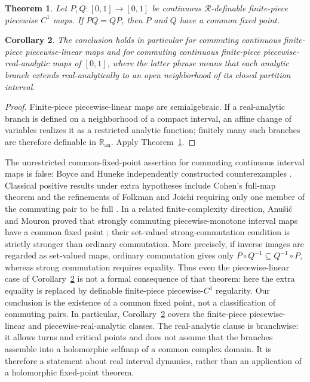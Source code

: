 \documentclass[11pt]{article}
\newtheorem{theorem}{Theorem}
\newtheorem{corollary}[theorem]{Corollary}
\theoremstyle{definition}
\theoremstyle{remark}
\newcommand{\I}{[0,1]}
\begin{document}
\begin{theorem}\label{thm:tame-C1}
Let $P,Q\colon\I\to\I$ be continuous $\mathcal R$-definable finite-piece
piecewise $C^1$ maps.  If $PQ=QP$, then $P$ and $Q$ have a common fixed
point.
\end{theorem}

\begin{corollary}\label{cor:analytic-PL}
The conclusion holds in particular for commuting continuous finite-piece
piecewise-linear maps and for commuting continuous finite-piece
piecewise-real-analytic maps of $[0,1]$, where the latter phrase means that
each analytic branch extends real-analytically to an open neighborhood of
its closed partition interval.
\end{corollary}

\begin{proof}
Finite-piece piecewise-linear maps are semialgebraic.  If a real-analytic
branch is defined on a neighborhood of a compact interval, an affine change
of variables realizes it as a restricted analytic function; finitely many
such branches are therefore definable in $\mathbb R_{\mathrm{an}}$.  Apply
Theorem~\ref{thm:tame-C1}.
\end{proof}

The unrestricted common-fixed-point assertion for commuting continuous
interval maps is false: Boyce and Huneke independently constructed
counterexamples \cite{Boyce,Huneke}.  Classical positive results under
extra hypotheses include Cohen's full-map theorem and the refinements of
Folkman and Joichi requiring only one member of the commuting pair to be
full \cite{Cohen,Folkman,Joichi}.  In a related finite-complexity direction,
Anu\v{s}i\'c and Mouron proved that strongly commuting piecewise-monotone
interval maps have a common fixed point \cite{AnusicMouron}; their
set-valued strong-commutation condition is strictly stronger than ordinary
commutation.  More precisely, if inverse images are regarded as set-valued
maps, ordinary commutation gives only
\(P\circ Q^{-1}\subseteq Q^{-1}\circ P\), whereas strong commutation requires
equality.  Thus even the piecewise-linear case of
Corollary~\ref{cor:analytic-PL} is not a formal consequence of that theorem:
here the extra equality is replaced by definable finite-piece
piecewise-\(C^1\) regularity.  Our conclusion is the existence of a common
fixed point, not a classification of commuting pairs.  In particular,
Corollary~\ref{cor:analytic-PL} covers the finite-piece piecewise-linear and
piecewise-real-analytic classes.
The real-analytic clause is branchwise: it allows turns and critical points
and does not assume that the branches assemble into a holomorphic selfmap
of a common complex domain.  It is therefore a statement about real
interval dynamics, rather than an application of a holomorphic fixed-point
theorem.
\end{document}
